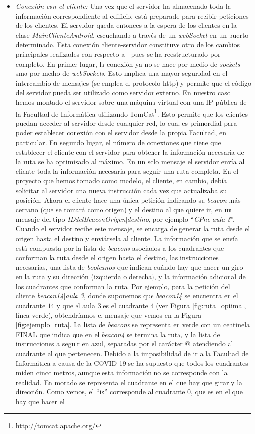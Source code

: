 \begin{itemize}
	\item \textit{Conexión con el cliente:} Una vez que el servidor ha almacenado toda la información correspondiente al edificio, está preparado para recibir peticiones de los clientes. El servidor queda entonces a la espera de los clientes en la clase \textit{MainClienteAndroid}, escuchando a través de un \textit{webSocket} en un puerto determinado. Esta conexión cliente-servidor constituye otro de los cambios principales realizados con respecto a \cite{TFGguia}, pues se ha reestructurado por completo. En primer lugar, la conexión ya no se hace por medio de \textit{sockets} sino por medio de \textit{webSockets}. Esto implica una mayor seguridad en el intercambio de mensajes (se emplea el protocolo http) y permite que el código del servidor pueda ser utilizado como servidor externo. En nuestro caso hemos montado el servidor sobre una máquina virtual con una IP pública de la Facultad de Informática utilizando TomCat\footnote{\url{http://tomcat.apache.org/}}. Esto permite que los clientes puedan acceder al servidor desde cualquier red, lo cual es primordial para poder establecer conexión con el servidor desde la propia Facultad, en particular. En segundo lugar, el número de conexiones que tiene que establecer el cliente con el servidor para obtener la información necesaria de la ruta se ha optimizado al máximo. En un solo mensaje el servidor envía al cliente toda la información necesaria para seguir una ruta completa. En el proyecto que hemos tomado como modelo, el cliente, en cambio, debía solicitar al servidor una nueva instrucción cada vez que actualizaba su posición. Ahora el cliente hace una única petición indicando su \textit{beacon} más cercano (que se tomará como origen) y el destino al que quiere ir, en un mensaje del tipo \textit{IDdelBeaconOrigen$|$destino}, por ejemplo ``\textit{CPne$|$aula 8}''. Cuando el servidor recibe este mensaje, se encarga de generar la ruta desde el origen hasta el destino y enviársela al cliente. La información que se envía está compuesta por la lista de \textit{beacons} asociados a los cuadrantes que conforman la ruta desde el origen hasta el destino, las instrucciones necesarias, una lista de \textit{booleanos} que indican cuándo hay que hacer un giro en la ruta y su dirección (izquierda o derecha), y la información adicional de los cuadrantes que conforman la ruta. Por ejemplo, para la petición del cliente \textit{beacon14$|$aula 3}, donde suponemos que \textit{beacon14} se encuentra en el cuadrante $14$ y que el aula 3 es el cuadrante 4 (ver Figura \ref{fig:ruta_optima}, línea verde), obtendríamos el mensaje que vemos en la Figura \ref{fig:ejemplo_ruta}. La lista de \textit{beacons} se representa en verde con un centinela FINAL que indica que en el \textit{beacon4} se termina la ruta, y la lista de instrucciones a seguir en azul, separadas por el carácter @ atendiendo al cuadrante al que pertenecen. Debido a la imposibilidad de ir a la Facultad de Informática a causa de la COVID-19 se ha supuesto que todos los cuadrantes miden cinco metros, aunque esta información no se corresponde con la realidad. En morado se representa el cuadrante en el que hay que girar y la dirección. Como vemos, el ``iz'' corresponde al cuadrante $0$, que es en el que hay que hacer el 
\end{itemize}
